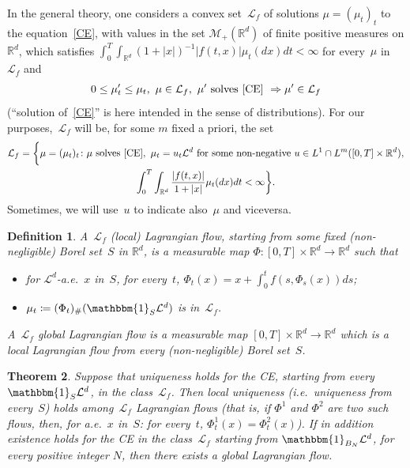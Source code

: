 \documentclass[a4paper,10pt]{article}
\newtheorem{theorem}{Theorem}[section]
\newtheorem{definition}[theorem]{Definition}
\newcommand\1{\mathbbm{1}}
\newcommand{\mr}{\mathbb{R}}
\newcommand{\mc}{\mathcal}
\numberwithin{equation}{section}
\begin{document}
In the general theory, one considers a convex set~$\mc{L}_f$ of solutions $\mu=(\mu_t)_t$ to the equation~\eqref{CE}, with values in the set $\mc{M}_+(\mr^d)$ of finite positive measures on $\mr^d$, which satisfies $\int^T_0\int_{\mr^d} (1+|x|)^{-1} |f(t,x)| \mu_t(dx)dt< \infty$ for every~$\mu$ in~$\mc{L}_f$ and
\begin{equation}
0\le\mu'_t\le\mu_t,\ \mu\in\mc{L}_f,\ \mu'\mbox{ solves~\eqref{CE} }\Rightarrow\mu'\in\mc{L}_f\label{condLb}
\end{equation}
(``solution of~\eqref{CE}'' is here intended in the sense of distributions). For our purposes,~$\mc{L}_f$ will be, for some $m$ fixed a priori, the set
\begin{multline*}
\mc{L}_f=\bigg\{\mu=(\mu_t)_t \colon \mu\mbox{ solves~\eqref{CE}},\ \mu_t=u_t\mc{L}^d \text{ for some non-negative } u\in L^1\cap L^m([0,T]\times\mr^d), \\ \int^T_0\int_{\mr^d}\frac{|f(t,x)|}{1+|x|}\mu_t(dx)dt< \infty \bigg\} .
\end{multline*}
Sometimes, we will use~$u$ to indicate also~$\mu$ and viceversa.

\begin{definition}
A~\emph{$\mc{L}_f$ \textup{(}local\textup{)} Lagrangian flow, starting from some fixed \textup{(}non-negligible\textup{)} Borel set~$S$ in $\mr^d$}, is a measurable map $\Phi \colon [0,T]\times\mr^d\rightarrow\mr^d$ such that
\begin{itemize}
\item for $\mc{L}^d$-a.e.~$x$ in~$S$, for every~$t$, $\Phi_t(x)=x+\int^t_0f(s,\Phi_s(x))ds$;
\item $\mu_t\coloneqq (\Phi_t)_\#( \1_{S} \mc{L}^d)$ is in~$\mc{L}_f$.
\end{itemize}
A~\emph{$\mc{L}_f$ global Lagrangian flow} is a measurable map $[0,T]\times\mr^d\rightarrow\mr^d$ which is a local Lagrangian flow from every \textup{(}non-negligible\textup{)} Borel set~$S$.
\end{definition}

\begin{theorem}\label{Lagrthm}
Suppose that uniqueness holds for the CE, starting from every $ \1_S \mc{L}^d$, in the class~$\mc{L}_f$. Then local uniqueness \textup{(}i.e.~uniqueness from every~$S$\textup{)} holds among~$\mc{L}_f$ Lagrangian flows \textup{(}that is, if $\Phi^1$ and $\Phi^2$ are two such flows, then, for a.e.~$x$ in~$S$: for every~$t$, $\Phi_t^1(x)=\Phi_t^2(x)$\textup{)}. If in addition existence holds for the CE in the class~$\mc{L}_f$ starting from $ \1_{B_N} \mc{L}^d$, for every positive integer $N$, then there exists a global Lagrangian flow.
\end{theorem}
\end{document}
